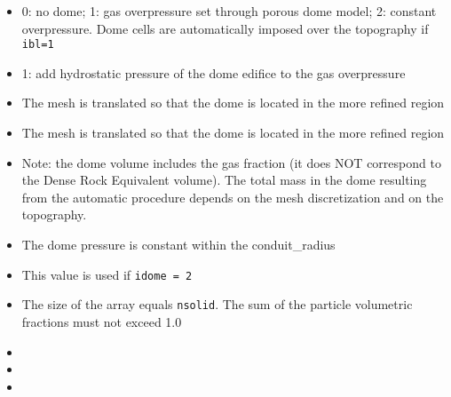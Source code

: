 \begin{itemize}
\item
{}
{0: no dome; 1: gas overpressure set through porous dome model; 2: constant overpressure.
Dome cells are automatically imposed over the topography if {\tt ibl=1}}

\item
{}
{1: add hydrostatic pressure of the dome edifice to the gas overpressure}

\item
{}
{The mesh is translated so that the dome is located in the more refined region}

\item
{}
{The mesh is translated so that the dome is located in the more refined region}

\item
{}
{Note: the dome volume includes the gas fraction (it does NOT correspond to the
Dense Rock Equivalent volume). The total mass in the dome resulting from the
automatic procedure depends on the mesh discretization and on the topography.}

\item
{}
{The dome pressure is constant within the conduit\_radius}

\item
{}
{This value is used if {\tt idome = 2}}

\item
{}
{The size of the array equals {\tt nsolid}. The sum of the particle volumetric fractions
must not exceed 1.0}

\item
{}
{}

\item
{}
{}

\item
{}


\end{itemize}
